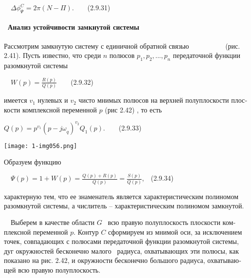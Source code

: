 \documentclass[a4paper]{article}
\begin{document}
{\begin{russian}\sffamily
\ \  $\mathit{Δϕ}_Ψ^C=2π(N-Π)$.\ \ \ \ (2.9.31)
\end{russian}}

\paragraph[\ Анализ устойчивости замкнутой системы]{\ Анализ устойчивости замкнутой системы}
{\begin{russian}\sffamily
Рассмотрим замкнутую систему с единичной обратной связью \ \ \ \ \ \ \ \ \ \ (рис. 2.41). Пусть известно, что среди  $n$
полюсов  $p_1,p_2,...,p_n$ передаточной функции разомкнутой системы
\end{russian}}

{\begin{russian}\sffamily
\ \  $W(p)=\frac{R(p)}{Q(p)}$\ \ \ \ (2.9.32)
\end{russian}}

{\begin{russian}\sffamily
имеется  $v_1$ нулевых и  $v_2$ чисто мнимых полюсов на верхней полуплоскости плоскости комплексной переменной  $p$ (рис
2.42) , то есть 
\end{russian}}

{\begin{russian}\sffamily
 $Q(p)=p^{v_1}(p-\mathit{jω}_q)^{v_2}Q_1(p)$.\ \ \ \ (2.9.33)
\end{russian}}

{\centering  \texttt{[image: 1-img056.png]} \par}
{\begin{russian}\sffamily
Образуем функцию
\end{russian}}

{\begin{russian}\sffamily
\ \  $Ψ(p)=1+W(p)=\frac{Q(p)+R(p)}{Q(p)}=\frac{S(p)}{Q(p)}$,\ \ (2.9.34)
\end{russian}}

{\begin{russian}\sffamily
характерную тем, что ее знаменатель является характеристическим полиномом разомкнутой системы, а числитель –
характеристическим полиномом замкнутой. 
\end{russian}}

{\begin{russian}\sffamily
\ \ Выберем в качестве области  $G$ \ всю правую полуплоскость плоскости комплексной переменной  $p$. Контур  $C$
сформируем из мнимой оси, за исключением точек, совпадающих с полюсами передаточной функции разомкнутой системы, дуг
окружностей бесконечно малого \ радиуса, охватывающих эти полюсы, как показано на рис. 2.42, и окружности бесконечно
большого радиуса, охватывающей всю правую полуплоскость. 
\end{russian}}
\end{document}
